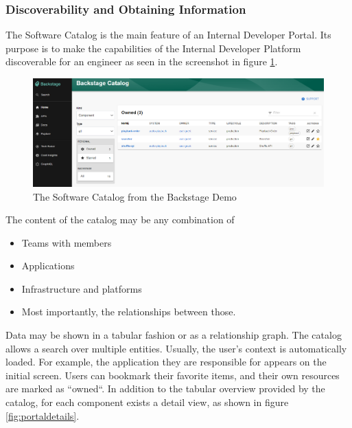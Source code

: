 \documentclass[a4paper,10pt]{article}
\begin{document}
    \subsubsection{Discoverability and Obtaining Information}
    \label{sssec:disc}
    The Software Catalog is the main feature of an Internal Developer Portal.
    Its purpose is to make the capabilities of the Internal Developer Platform discoverable for an engineer as seen in the
    screenshot in figure \ref{fig:catalog}.\\

    \begin{figure}[h]
        \includegraphics[width=\linewidth]{backstage_catalog}
        \caption{The Software Catalog from the Backstage Demo\parencite{backstagedemo}}
        \label{fig:catalog}
    \end{figure}
    The content of the catalog may be any combination of
    \begin{itemize}
        \item Teams with members
        \item Applications
        \item Infrastructure and platforms
        \item Most importantly, the relationships between those.
    \end{itemize}
    Data may be shown in a tabular fashion or as a relationship graph.
    The catalog allows a search over multiple entities.
    Usually, the user's context is automatically loaded.
    For example, the application they are responsible for appears on the initial screen.
    Users can bookmark their favorite items, and their own resources are marked as ``owned``.
    In addition to the tabular overview provided by the catalog, for each component exists a detail view, as shown in
    figure \ref{fig:portaldetails}.
\end{document}
